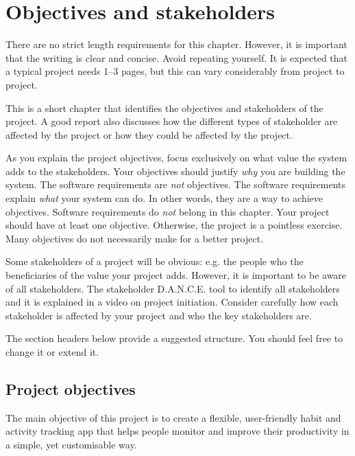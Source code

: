 \chapter{Objectives and stakeholders}
\label{sect:objectives}


\begin{length}
There are no strict length requirements for this chapter.  However, it is important that the writing is clear and concise.  Avoid repeating yourself.  It is expected that a typical project needs 1--3 pages, but this can vary considerably from project to project.
\end{length}

\begin{expectations}
This is a short chapter that identifies the objectives and stakeholders of the project.  A good report also discusses how the different types of stakeholder are affected by the project or how they could be affected by the project.

As you explain the project objectives, focus exclusively on what value the system adds to the stakeholders.  Your objectives should justify \emph{why} you are building the system.  The software requirements are \emph{not} objectives.  The software requirements explain \emph{what} your system can do.  In other words, they are a way to achieve objectives.  Software requirements do \emph{not} belong in this chapter.  Your project should have at least one objective.  Otherwise, the project is a pointless exercise.  Many objectives do not necessarily make for a better project.

Some stakeholders of a project will be obvious: e.g. the people who the beneficiaries of the value your project adds.  However, it is important to be aware of all stakeholders.  The stakeholder D.A.N.C.E. tool to identify all stakeholders and it is explained in a video on project initiation.  Consider carefully how each stakeholder is affected by your project and who the key stakeholders are.

The section headers below provide a suggested structure.  You should feel free to change it or extend it.
\end{expectations}

\section{Project objectives}
\label{sect:objectives}
The main objective of this project is to create a flexible, user-friendly habit and activity tracking app that helps people monitor and improve their productivity in a simple, yet customisable way. 

